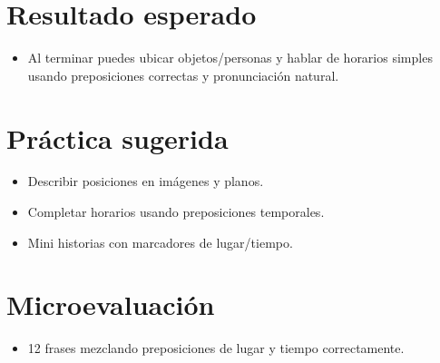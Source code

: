 \section{Resultado esperado}
\begin{itemize}[leftmargin=*]
	\item Al terminar puedes ubicar objetos/personas y hablar de horarios simples usando preposiciones correctas y pronunciación natural.
\end{itemize}

\section{Práctica sugerida}
\begin{itemize}[leftmargin=*]
	\item Describir posiciones en imágenes y planos.
	\item Completar horarios usando preposiciones temporales.
	\item Mini historias con marcadores de lugar/tiempo.
\end{itemize}

\section{Microevaluación}
\begin{itemize}[leftmargin=*]
	\item 12 frases mezclando preposiciones de lugar y tiempo correctamente.
\end{itemize}

